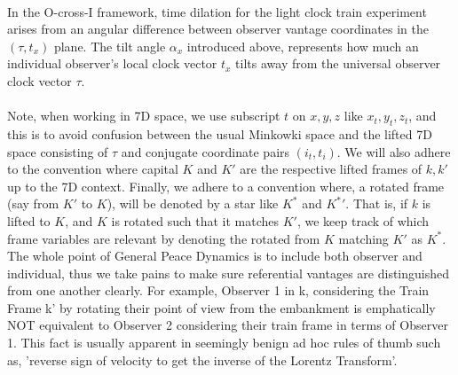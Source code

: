 \documentclass{article}
\begin{document}
\\
\noindent In the O-cross-I framework, time dilation for the light clock train experiment arises from an angular difference between observer vantage coordinates in the $(\tau, t_x)$ plane. The tilt angle $\alpha_x$ introduced above, represents how much an individual observer's local clock vector $t_x$ tilts away from the universal observer clock vector $\tau$.\\
\\
Note, when working in 7D space, we use subscript $t$ on $x, y, z$ like $x_t, y_t, z_t$, and this is to avoid confusion between the usual Minkowki space and the lifted 7D space consisting of $\tau$ and conjugate coordinate pairs $(i_t, t_i)$. We will also adhere to the convention where capital $K$ and $K'$ are the respective lifted frames of $k, k'$ up to the 7D context. Finally, we adhere to a convention where, a rotated frame (say from $K'$ to $K$), will be denoted by a star like $K^*$ and ${K^*}'$. That is, if $k$ is lifted to $K$, and $K$ is rotated such that it matches $K'$, we keep track of which frame variables are relevant by denoting the rotated from $K$ matching $K'$ as $K^*$. The whole point of General Peace Dynamics is to include both observer and individual, thus we take pains to make sure referential vantages are distinguished from one another clearly. For example, Observer 1 in k, considering the Train Frame k' by rotating their point of view from the embankment is emphatically NOT equivalent to Observer 2 considering their train frame in terms of Observer 1. This fact is usually apparent in seemingly benign ad hoc rules of thumb such as, 'reverse sign of velocity to get the inverse of the Lorentz Transform'.\\
 \\
\noindent 
\renewcommand{\arraystretch}{1.5}
\setlength{\arraycolsep}{4pt} 
\end{document}

